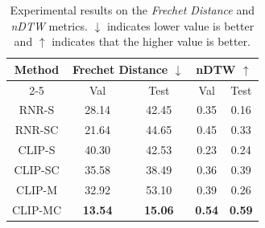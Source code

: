 \documentclass[11pt]{article}
\begin{document}
\begin{table}[]
\begin{center}
\small
\begin{tabular}{|c|cc|cc|}
\hline
\multirow{2}{*}{Method} & \multicolumn{2}{c|}{Frechet Distance $\downarrow$}                & \multicolumn{2}{c|}{nDTW $\uparrow$}                          \\ \cline{2-5} 
        & \multicolumn{1}{c|}{Val}   & Test  & \multicolumn{1}{c|}{Val}  & Test \\ \hline
RNR-S   & \multicolumn{1}{c|}{28.14} & 42.45 & \multicolumn{1}{c|}{0.35} & 0.16 \\ \hline
RNR-SC  & \multicolumn{1}{c|}{21.64} & 44.65 & \multicolumn{1}{c|}{0.45} & 0.33 \\ \hline
CLIP-S  & \multicolumn{1}{c|}{40.30} & 42.53 & \multicolumn{1}{c|}{0.23} & 0.24 \\ \hline
CLIP-SC & \multicolumn{1}{c|}{35.58} & 38.49 & \multicolumn{1}{c|}{0.36} & 0.39 \\ \hline
CLIP-M  & \multicolumn{1}{c|}{32.92} & 53.10 & \multicolumn{1}{c|}{0.39} & 0.26 \\ \hline
CLIP-MC                 & \multicolumn{1}{c|}{\textbf{13.54}} & \textbf{15.06} & \multicolumn{1}{c|}{\textbf{0.54}} & \textbf{0.59} \\ \hline
\end{tabular}
\end{center}
\caption{Experimental results on the \textit{Frechet Distance} and \textit{nDTW} metrics. $\downarrow$ indicates lower value is better and $\uparrow$ indicates that the higher value is better.}
\label{table:table_2}
\end{table}

\end{document}

